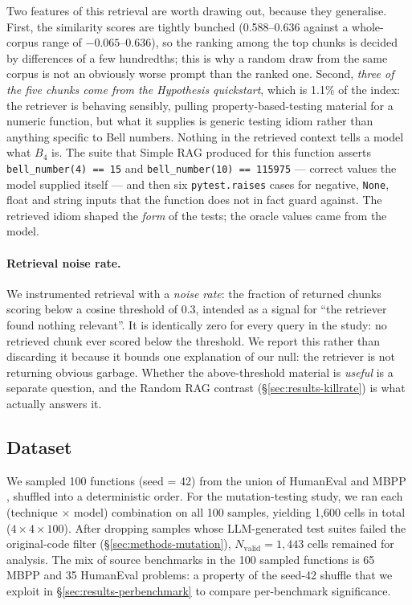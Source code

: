 \documentclass[smallextended]{svjour3}
\begin{document}
\noindent Two features of this retrieval are worth drawing out,
because they generalise. First, the similarity scores are tightly
bunched (0.588--0.636 against a whole-corpus range of
$-0.065$--$0.636$), so the ranking among the top chunks is decided by
differences of a few hundredths; this is why a random draw from the
same corpus is not an obviously worse prompt than the ranked one.
Second, \emph{three of the five chunks come from the Hypothesis
quickstart}, which is 1.1\% of the index: the retriever is behaving
sensibly, pulling property-based-testing material for a numeric
function, but what it supplies is generic testing idiom rather than
anything specific to Bell numbers. Nothing in the retrieved context
tells a model what $B_4$ is. The suite that Simple RAG produced for
this function asserts \texttt{bell\_number(4) == 15} and
\texttt{bell\_number(10) == 115975} --- correct values the model
supplied itself --- and then six \texttt{pytest.raises} cases for
negative, \texttt{None}, float and string inputs that the function
does not in fact guard against. The retrieved idiom shaped the
\emph{form} of the tests; the oracle values came from the model.

\paragraph{Retrieval noise rate.} We
instrumented retrieval with a \emph{noise rate}: the fraction of
returned chunks scoring below a cosine threshold of 0.3, intended as a
signal for ``the retriever found nothing relevant''. It is identically
zero for every query in the study: no retrieved chunk ever scored
below the threshold. We report this rather than discarding it because
it bounds one explanation of our null: the retriever is not returning
obvious garbage. Whether the above-threshold material is
\emph{useful} is a separate question, and the Random RAG contrast
(\S\ref{sec:results-killrate}) is what actually answers it.

\subsection{Dataset}\label{sec:methods-dataset}

We sampled 100 functions (seed = 42) from the union of HumanEval
\citep{chen2021humaneval} and MBPP \citep{austin2021mbpp},
shuffled into a deterministic order. For the mutation-testing
study, we ran each (technique $\times$ model) combination on all 100 samples, yielding 1{,}600 cells in total ($4 \times 4 \times 100$). After dropping samples whose
LLM-generated test suites failed the original-code filter
(\S\ref{sec:methods-mutation}),
$N_{\text{valid}} = 1{,}443$ cells remained for analysis. The mix of source benchmarks in the 100 sampled functions is 65 MBPP and 35 HumanEval problems: a property of
the seed-42 shuffle that we exploit in
\S\ref{sec:results-perbenchmark} to compare per-benchmark
significance.
\end{document}
